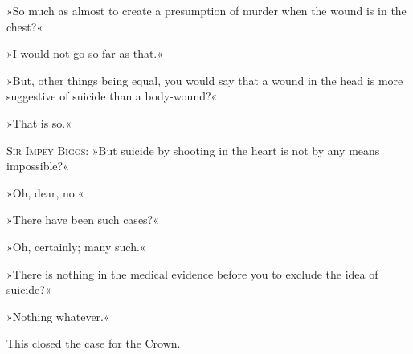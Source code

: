 »So much as almost to create a presumption of murder when the wound is in the chest?«

»I would not go so far as that.«

»But, other things being equal, you would say that a wound in the head is more suggestive of suicide than a body-wound?«

»That is so.«

\makeatletter
{}
{%
  \enlargethispage{\baselineskip}
}{%
}
\makeatother

\textsc{Sir Impey Biggs}: »But suicide by shooting in the heart is not by any means impossible?«

»Oh, dear, no.«

»There have been such cases?«

»Oh, certainly; many such.«

»There is nothing in the medical evidence before you to exclude the idea of suicide?«

»Nothing whatever.«

This closed the case for the Crown. 
